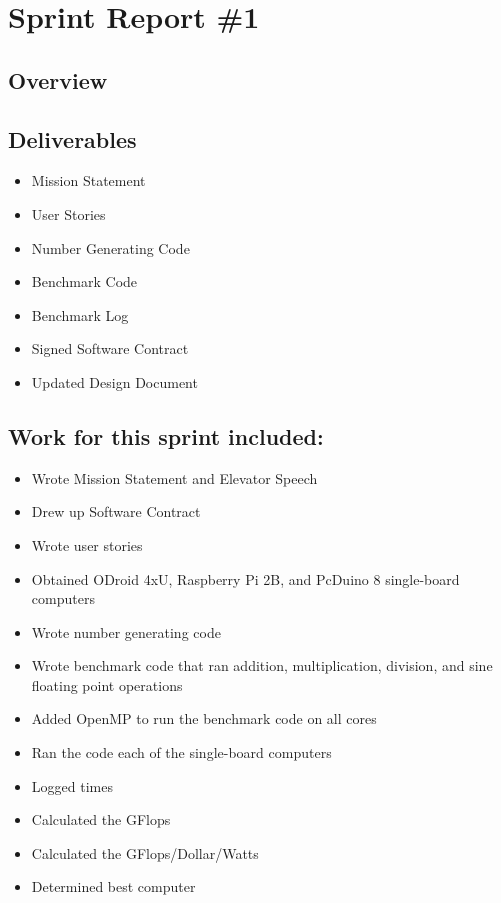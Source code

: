 

\section{Sprint Report \#1}

\subsection*{Overview}

\subsection*{Deliverables}
\begin{itemize}
	\item Mission Statement
	\item User Stories
	\item Number Generating Code
	\item Benchmark Code
	\item Benchmark Log
	\item Signed Software Contract
	\item Updated Design Document
\end{itemize}

\subsection*{Work for this sprint included:}
\begin{itemize}
	\item Wrote Mission Statement and Elevator Speech
	\item Drew up Software Contract
	\item Wrote user stories
	\item Obtained ODroid 4xU, Raspberry Pi 2B, and PcDuino 8 single-board computers
	\item Wrote number generating code
	\item Wrote benchmark code that ran addition, multiplication, division, and sine floating point operations
	\item Added OpenMP to run the benchmark code on all cores
	\item Ran the code each of the single-board computers
	\item Logged times
	\item Calculated the GFlops
	\item Calculated the GFlops/Dollar/Watts
	\item Determined best computer
\end{itemize}

